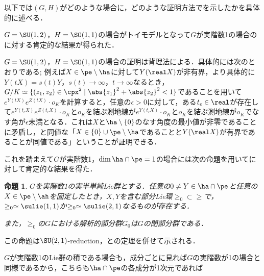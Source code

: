 \documentclass[12pt,dvipdfmx,uplatex]{jsarticle}
\newcounter{countabst}
\newtheorem{prop-a}[countabst]{命題}
\begin{document}
以下では$(G,H) $がどのような場合に，どのような証明方法でを示したかを具体的に述べる．

$G = \SU(1,2) $，$H= \SO(1,1)$の場合がトイモデルとなって$G$が実階数1の場合のに対する肯定的な結果が得られた．

$G = \SU(1,2) $，$H= \SO(1,1)$の場合の証明は背理法による．具体的には次のとおりである; 例えば$X\in \pe\setminus\ha $に対して$Y(\real X) $が非有界，より具体的に$Y(t X) = s(t) Y$，$s(t) \to \infty$，$t\to \infty $なるとき，$G/K \simeq \{(z_1,z_2)\in \cpx^2 \mid \abs{z_1}^2 + \abs{z_2}^2 < 1 \} $であることを用いて$e^{Y(tX)}e^{Z(tX)}\cdot o_K $を計算すると，任意の$\epsilon > 0$に対して，ある$t_{\epsilon}\in \real$が存在して$ e^{Y(t_{\epsilon} X)}e^{Z(t_{\epsilon} X)}\cdot o_K $と$o_K$を結ぶ測地線が$e^{Y(t_{\epsilon} X)}\cdot o_K $と$o_K$を結ぶ測地線が$o_K$でなす角が$\epsilon $未満となる．これは$X$と$\ha\setminus\{0\} $のなす角度の最小値が非零であることに矛盾し，と同値な「$X\in \{0\}\cup \pe\setminus\ha $であることと$ Y(\real X) $が有界であることが同値である」ということが証明できる．

これを踏まえて$G$が実階数1，$\dim \ha\cap\pe =1 $の場合には次の命題を用いてに対して肯定的な結果を得た．

\begin{prop-a}
  $G$を実階数1の実半単純Lie群とする．任意の$0\neq Y\in \ha\cap\pe $と任意の$X\in \pe\setminus \ah$を固定したとき，$X,Y$を含む部分Lie環$\ge_0\subset \ge$で，$\ge_0\simeq \sulie(1,1) $か$\ge_0\simeq \sulie(2,1)$なるものが存在する．

  また，$\ge_0$の$G$における解析的部分群$G_0$は$G$の閉部分群である．
\end{prop-a}
この命題は{$\SU(2,1) $-reduction}，\cite{hel01}と\cite{yos38}の定理を併せて示される．



$G$が実階数1のLie群の積である場合も，成分ごとに見れば$G$の実階数が1の場合と同様であるから，こちらも$\ha\cap \pe $の各成分が1次元であれば
\end{document}

